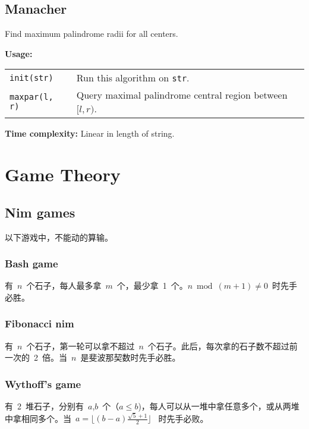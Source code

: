 \subsection{Manacher}
Find maximum palindrome radii for all centers. \par
\textbf{Usage:} \\[0.1cm]
\begin{tabular}{p{2.5cm} p{9cm}}
  \lstinline|init(str)| & Run this algorithm on \lstinline|str|.  \\
  \lstinline|maxpar(l, r)| & Query maximal palindrome central region between $[l, r)$. \\
\end{tabular} \par
\textbf{Time complexity:} Linear in length of string. \par


\section{Game Theory}
\subsection{Nim games}
以下游戏中，不能动的算输。
\subsubsection{Bash game}
有~$n$~个石子，每人最多拿~$m$~个，最少拿~1~个。$n \bmod (m+1) \neq 0$~时先手必胜。
\subsubsection{Fibonacci nim}
有~$n$~个石子，第一轮可以拿不超过~$n$~个石子。此后，每次拿的石子数不超过前一次的~2~倍。当~$n$~是斐波那契数时先手必胜。
\subsubsection{Wythoff's game}
有~2~堆石子，分别有~$a$,$b$~个（$a \leq b$)，每人可以从一堆中拿任意多个，或从两堆中拿相同多个。当~$a = \lfloor (b-a)\frac{\sqrt{5}+1}{2} \rfloor$~ 时先手必败。



